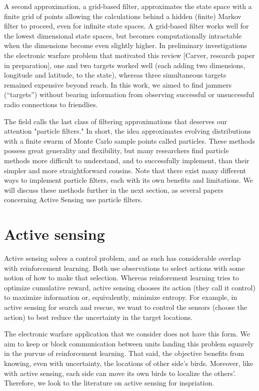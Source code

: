 \documentclass{article}
\begin{document}
A second approximation, a grid-based filter, approximates the state
space with a finite grid of points allowing the calculations behind a
hidden (finite) Markov filter to proceed, even for infinite state
spaces.  A grid-based filter works well for the lowest dimensional
state spaces, but becomes computationally intractable when the
dimensions become even slightly higher.  In preliminary investigations
the electronic warfare problem that motivated this review [Carver,
research paper in preparation], one and two targets worked well (each
adding two dimensions, longitude and latitude, to the state), whereas
three simultaneous targets remained expensive beyond reach.  In this
work, we aimed to find jammers (``targets'') without bearing
information from observing successful or unsuccessful radio
connections to friendlies.

The field calls the last class of filtering approximations that
deserves our attention "particle filters."  In short, the idea
approximates evolving distributions with a finite swarm of Monte Carlo
sample points called particles.  These methods possess great
generality and flexibility, but many researchers find particle methods
more difficult to understand, and to successfully implement, than
their simpler and more straightforward cousins.  Note that there exist
many different ways to implement particle filters, each with its own
benefits and limitations.  We will discuss these methods further in
the next section, as several papers concerning Active Sensing use
particle filters.

\section{Active sensing}

Active sensing solves a control problem, and as such has considerable
overlap with reinforcement learning.  Both use observations to select
actions with some notion of how to make that selection.  Whereas
reinforement learning tries to optimize cumulative reward, active
sensing chooses its action (they call it control) to maximize
information or, equivalently, minimize entropy.  For example, in
active sensing for search and rescue, we want to control the sensors
(choose the action) to best reduce the uncertainty in the target
locations.

The electronic warfare application that we consider does not have this
form.  We aim to keep or block communication between units landing
this problem squarely in the purvue of reinforcement learning.  That
said, the objective benefits from knowing, even with uncertainty, the
locations of other side's birds.  Moreover, like with active sensing,
each side can move its own birds to localize the others'.  Therefore,
we look to the literature on active sensing for inspriation.
\end{document}

